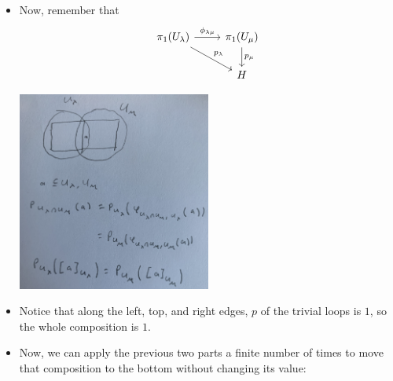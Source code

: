 \documentclass[8pt]{beamer}
\begin{document}
  \begin{frame}
    \begin{columns}
      \begin{column}[T]{0.5\textwidth}
        \begin{itemize}
          \item Now, remember that
            \[\begin{tikzcd}[ampersand replacement=\&]
              \pi_1(U_\lambda) \ar[rd, "p_\lambda"]
              \ar[r,"\phi_{\lambda\mu}"] \& \pi_1(U_\mu) \ar[d, "p_\mu"]\\
                  \& H
              \end{tikzcd}\]
            \begin{center}
              \includegraphics[width=0.5\textwidth]{img/proof-pt2-pair-rectangle.JPG}
            \end{center}

          \item Notice that along the left, top, and right edges, $p$ of the trivial
            loops is $1$, so the whole composition is $1$.

          \item Now, we can apply the previous two parts a finite number of times to
            move that composition to the bottom without changing its value:



\end{itemize}
\end{column}
\end{columns}
\end{frame}
\end{document}
